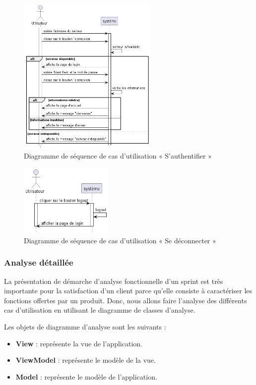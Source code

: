 \begin{figure}[H]
  \centering
  \includegraphics[width=0.6\textwidth]{out/diagrams/authentification/simple_login/simple_login}
  \caption{Diagramme de séquence de cas d'utilisation « S'authentifier »}
  \label{fig:sequence_login}
\end{figure}

\begin{figure}[H]
  \centering
  \includegraphics[width=0.4\textwidth]{out/diagrams/authentification/logout/logout}
  \caption{Diagramme de séquence de cas d'utilisation « Se déconnecter »}
  \label{fig:sequence_logout}
\end{figure}


\subsubsection{Analyse détaillée}
La présentation de démarche d'analyse fonctionnelle d'un sprint est très importante pour la satisfaction d'un client parce qu'elle consiste à caractériser les fonctions offertes par un produit.
Donc, nous allons faire l'analyse des différents cas d'utilisation en utilisant le diagramme de classes d'analyse.

Les objets de diagramme d'analyse sont les suivants :
\begin{itemize}
  \item \textbf{View} : représente la vue de l'application.
  \item \textbf{ViewModel} : représente le modèle de la vue.
  \item \textbf{Model} : représente le modèle de l'application.
\end{itemize}

